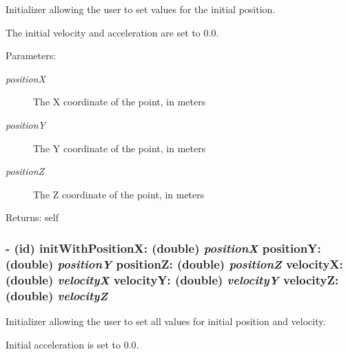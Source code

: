 Initializer allowing the user to set values for the initial position. 

The initial velocity and acceleration are set to 0.0.

\begin{Desc}
\item[Parameters:]
\begin{description}
\item[{\em positionX}]The X coordinate of the point, in meters \item[{\em positionY}]The Y coordinate of the point, in meters \item[{\em positionZ}]The Z coordinate of the point, in meters\end{description}
\end{Desc}
\begin{Desc}
\item[Returns:]self \end{Desc}
\hypertarget{interface_i_m_s_r_point_object_4ed4386983dba714a6678023ac353199}{
\subsubsection[{initWithPositionX:positionY:positionZ:velocityX:velocityY:velocityZ:}]{\setlength{\rightskip}{0pt plus 5cm}- (id) initWithPositionX: (double) {\em positionX}\/ positionY: (double) {\em positionY}\/ positionZ: (double) {\em positionZ}\/ velocityX: (double) {\em velocityX}\/ velocityY: (double) {\em velocityY}\/ velocityZ: (double) {\em velocityZ}}}
\label{interface_i_m_s_r_point_object_4ed4386983dba714a6678023ac353199}


Initializer allowing the user to set all values for initial position and velocity. 

Initial acceleration is set to 0.0.

